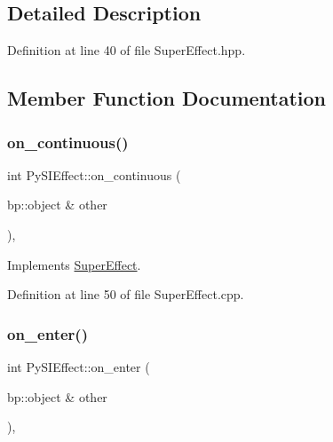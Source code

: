 \subsection{Detailed Description}


Definition at line 40 of file Super\+Effect.\+hpp.



\subsection{Member Function Documentation}
\mbox{\label{class_py_s_i_effect_a21b5ddc6c8b8e54b65618939a708a765}} 
\subsubsection{\texorpdfstring{on\_continuous()}{on\_continuous()}}
{\footnotesize\ttfamily int Py\+S\+I\+Effect\+::on\+\_\+continuous (\begin{DoxyParamCaption}\item[{bp\+::object \&}]{other }\end{DoxyParamCaption})\hspace{0.3cm}{\ttfamily [override]}, {\ttfamily [virtual]}}



Implements \mbox{\hyperlink{class_super_effect_aa94d8221f92a6b045589dc9df4c4d049}{Super\+Effect}}.



Definition at line 50 of file Super\+Effect.\+cpp.

\mbox{\label{class_py_s_i_effect_aeb22fda0e77d4205ff977c478f97649a}} 
\subsubsection{\texorpdfstring{on\_enter()}{on\_enter()}}
{\footnotesize\ttfamily int Py\+S\+I\+Effect\+::on\+\_\+enter (\begin{DoxyParamCaption}\item[{bp\+::object \&}]{other }\end{DoxyParamCaption})\hspace{0.3cm}{\ttfamily [override]}, {\ttfamily [virtual]}}




